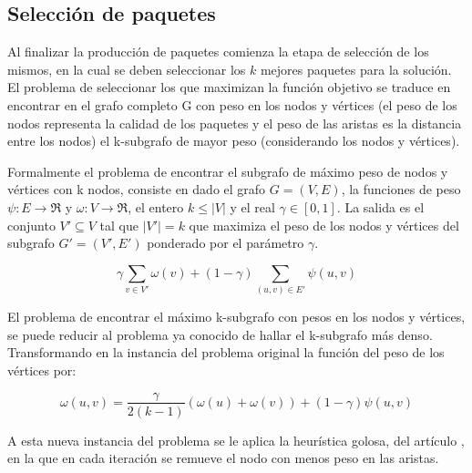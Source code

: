 \subsection{Selección de paquetes}
Al finalizar la producción de paquetes comienza la etapa de selección de los mismos, en la cual se deben seleccionar los $k$ mejores paquetes para la solución. El problema de seleccionar los que maximizan la función objetivo se traduce en encontrar en el grafo completo G con peso en los nodos y vértices (el peso de los nodos representa la calidad de los paquetes y el peso de las aristas es la distancia entre los nodos) el k-subgrafo de mayor peso (considerando los nodos y vértices).

Formalmente el problema de encontrar el subgrafo de máximo peso de nodos y vértices con k nodos, consiste en dado el grafo $ G = (V,E) $, la funciones de peso $\psi : E \rightarrow \Re$ y $\omega : V \rightarrow \Re$, el entero $ k \leq |V| $ y el real $\gamma \in [0,1]$. La salida es el conjunto $V' \subseteq V$ tal que $|V'| = k$ que maximiza el peso de los nodos y vértices del subgrafo $G' = (V', E')$ ponderado por el parámetro $\gamma$.

\begin{equation}
\gamma \sum_{v \in V'}{\omega(v)} + (1 - \gamma) \sum_{(u,v) \in E'}{\psi(u,v)}
\end{equation}

El problema de encontrar el máximo k-subgrafo con pesos en los nodos y vértices, se puede reducir al problema ya conocido de hallar el k-subgrafo más denso\cite{DBLP:journals/algorithmica/FeigePK01}. Transformando en la instancia del problema original la función del peso de los vértices por:
 
\begin{equation}
\omega(u,v) = \dfrac{\gamma}{2( k - 1)} (\omega(u) + \omega(v)) + (1 - \gamma)\psi(u,v) 
\end{equation}

A esta nueva instancia del problema se le aplica la heurística golosa, del artículo \cite{journals/tkde/Amer-YahiaBCFMZ14}, en la que en cada iteración se remueve el nodo con menos peso en las aristas.


